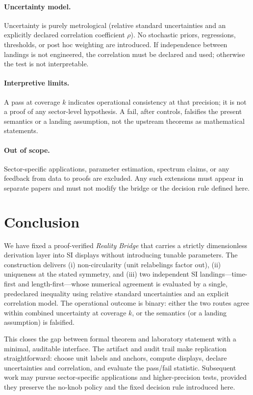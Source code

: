\documentclass[11pt]{article}
\begin{document}
\paragraph{Uncertainty model.}
Uncertainty is purely metrological (relative standard uncertainties and an explicitly declared correlation coefficient \(\rho\)). No stochastic priors, regressions, thresholds, or post hoc weighting are introduced. If independence between landings is not engineered, the correlation must be declared and used; otherwise the test is not interpretable.

\paragraph{Interpretive limits.}
A pass at coverage \(k\) indicates operational consistency at that precision; it is not a proof of any sector-level hypothesis. A fail, after controls, falsifies the present semantics or a landing assumption, not the upstream theorems as mathematical statements.

\paragraph{Out of scope.}
Sector-specific applications, parameter estimation, spectrum claims, or any feedback from data to proofs are excluded. Any such extensions must appear in separate papers and must not modify the bridge or the decision rule defined here.

\section{Conclusion}

We have fixed a proof-verified \emph{Reality Bridge} that carries a strictly dimensionless derivation layer into SI displays without introducing tunable parameters. The construction delivers (i) non-circularity (unit relabelings factor out), (ii) uniqueness at the stated symmetry, and (iii) two independent SI landings—time-first and length-first—whose numerical agreement is evaluated by a single, predeclared inequality using relative standard uncertainties and an explicit correlation model. The operational outcome is binary: either the two routes agree within combined uncertainty at coverage \(k\), or the semantics (or a landing assumption) is falsified.

This closes the gap between formal theorem and laboratory statement with a minimal, auditable interface. The artifact and audit trail make replication straightforward: choose unit labels and anchors, compute displays, declare uncertainties and correlation, and evaluate the pass/fail statistic. Subsequent work may pursue sector-specific applications and higher-precision tests, provided they preserve the no-knob policy and the fixed decision rule introduced here.
\end{document}
